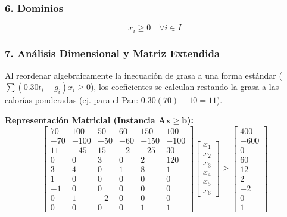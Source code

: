 \documentclass{article}
\begin{document}
	\subsubsection*{6. Dominios}
	$$ x_i \geq 0 \quad \forall i \in I $$
	
	\subsubsection*{7. Análisis Dimensional y Matriz Extendida}
	Al reordenar algebraicamente la inecuación de grasa a una forma estándar ($\sum (0.30 t_i - g_i) x_i \geq 0$), los coeficientes se calculan restando la grasa a las calorías ponderadas (ej. para el Pan: $0.30(70) - 10 = 11$).
	
	\textbf{Representación Matricial (Instancia $\mathbf{A x} \ge \mathbf{b}$):}
	$$
	\begin{bmatrix}
		70 & 100 & 50 & 60 & 150 & 100 \\
		-70 & -100 & -50 & -60 & -150 & -100 \\
		11 & -45 & 15 & -2 & -25 & 30 \\
		0 & 0 & 3 & 0 & 2 & 120 \\
		3 & 4 & 0 & 1 & 8 & 1 \\
		1 & 0 & 0 & 0 & 0 & 0 \\
		-1 & 0 & 0 & 0 & 0 & 0 \\
		0 & 1 & -2 & 0 & 0 & 0 \\
		0 & 0 & 0 & 0 & 1 & 1
	\end{bmatrix}
	\begin{bmatrix} 
		x_1 \\ x_2 \\ x_3 \\ x_4 \\ x_5 \\ x_6 
	\end{bmatrix}
	\geq 
	\begin{bmatrix} 
		400 \\ -600 \\ 0 \\ 60 \\ 12 \\ 2 \\ -2 \\ 0 \\ 1 
	\end{bmatrix}
	$$
	
\end{document}
